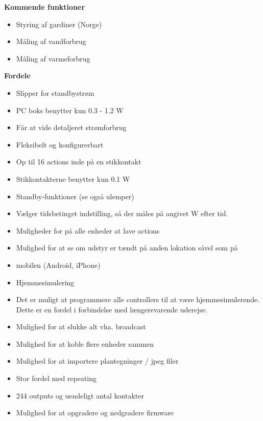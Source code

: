 {\bf Kommende funktioner}
\begin{itemize}
    \item Styring af gardiner (Norge)
    \item Måling af vandforbrug
    \item Måling af varmeforbrug
\end{itemize}

{\bf Fordele}
\begin{itemize}
    \item Slipper for standbystrøm
    \item PC boks benytter kun 0.3 - 1.2 W
    \item Får at vide detaljeret strømforbrug
    \item Fleksibelt og konfigurerbart
    \item Op til 16 actions inde på en stikkontakt
    \item Stikkontakterne benytter kun 0.1 W
    \item Standby-funktioner (se også ulemper)
    \item Vælger tidsbetinget indstilling, så der måles på angivet W efter tid.
    \item Muligheder for på alle enheder at lave actions
    \item Mulighed for at se om udstyr er tændt på anden lokation såvel som på     \item mobilen (Android, iPhone)
    \item Hjemmesimulering
    \item Det er muligt at programmere alle controllers til at være hjemmesimulerende. Dette er en fordel i forbindelse med længerevarende uderejse.
    \item Mulighed for at slukke alt vha. broadcast
    \item Mulighed for at koble flere enheder sammen
    \item Mulighed for at importere plantegninger / jpeg filer
    \item Stor fordel med repeating
    \item 244 outputs og uendeligt antal kontakter
    \item Mulighed for at opgradere og nedgradere firmware
\end{itemize}

